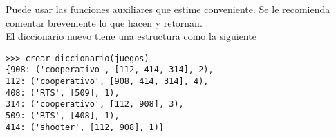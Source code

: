 Puede usar las funciones auxiliares que estime conveniente. Se le recomienda comentar brevemente lo que hacen y retornan.
\\
El diccionario nuevo tiene una estructura como la siguiente

\begin{lstlisting}[style=consola]
>>> crear_diccionario(juegos)
{908: ('cooperativo', [112, 414, 314], 2), 
112: ('cooperativo', [908, 414, 314], 4), 
408: ('RTS', [509], 1), 
314: ('cooperativo', [112, 908], 3), 
509: ('RTS', [408], 1), 
414: ('shooter', [112, 908], 1)}
\end{lstlisting}